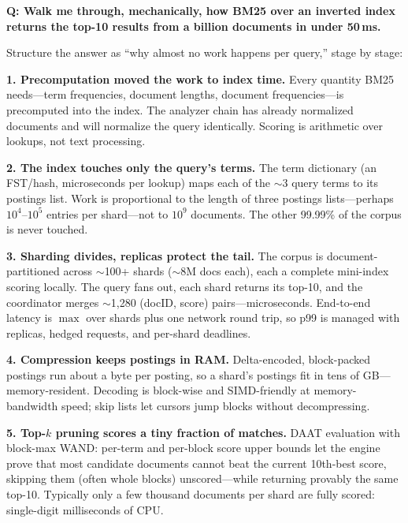 \begin{interviewq}
\textbf{Q: Walk me through, mechanically, how BM25 over an inverted index returns the top-10 results from a billion documents in under 50\,ms.}

 \quad {} \quad \badgefreq{\freqhigh}

\stronganswer

Structure the answer as ``why almost no work happens per query,'' stage by stage:

\textbf{1. Precomputation moved the work to index time.} Every quantity BM25 needs---term frequencies, document lengths, document frequencies---is precomputed into the index. The analyzer chain has already normalized documents and will normalize the query identically. Scoring is arithmetic over lookups, not text processing.

\textbf{2. The index touches only the query's terms.} The term dictionary (an FST/hash, microseconds per lookup) maps each of the $\sim$3 query terms to its postings list. Work is proportional to the length of three postings lists---perhaps $10^4$--$10^5$ entries per shard---not to $10^9$ documents. The other 99.99\% of the corpus is never touched.

\textbf{3. Sharding divides, replicas protect the tail.} The corpus is document-partitioned across $\sim$100+ shards ($\sim$8M docs each), each a complete mini-index scoring locally. The query fans out, each shard returns its top-10, and the coordinator merges $\sim$1{,}280 (docID, score) pairs---microseconds. End-to-end latency is $\max$ over shards plus one network round trip, so p99 is managed with replicas, hedged requests, and per-shard deadlines.

\textbf{4. Compression keeps postings in RAM.} Delta-encoded, block-packed postings run about a byte per posting, so a shard's postings fit in tens of GB---memory-resident. Decoding is block-wise and SIMD-friendly at memory-bandwidth speed; skip lists let cursors jump blocks without decompressing.

\textbf{5. Top-$k$ pruning scores a tiny fraction of matches.} DAAT evaluation with block-max WAND: per-term and per-block score upper bounds let the engine prove that most candidate documents cannot beat the current 10th-best score, skipping them (often whole blocks) unscored---while returning provably the same top-10. Typically only a few thousand documents per shard are fully scored: single-digit milliseconds of CPU.


\end{interviewq}
